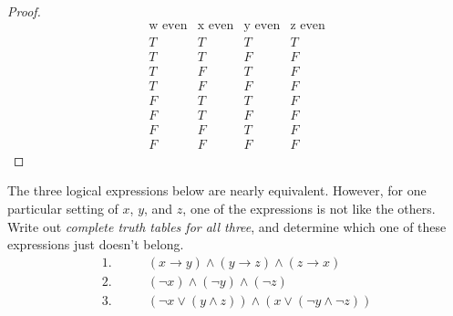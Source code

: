\documentclass[twoside,12pt]{article}
\begin{document}
{\begin{proof}
\[
\begin{array}{ccc|c}
\text{w even} & \text{x even} & \text{y even} & \text{z even} \\ \hline
T & T & T & T \\
T & T & F & F \\
T & F & T & F \\
T & F & F & F \\
F & T & T & F \\
F & T & F & F \\
F & F & T & F \\
F & F & F & F
\end{array}
\]

\end{proof}
}

\begin{problem}{14}
The three logical expressions below are nearly equivalent.  However,
for one particular setting of $x$, $y$, and $z$, one of the
expressions is not like the others.  Write out \textit{complete truth
tables for all three}, and determine which one of these expressions
just doesn't belong.
%
\begin{align*}
1. & \qquad (x \rightarrow y) \wedge (y \rightarrow z) \wedge (z \rightarrow x) \\
2. & \qquad (\neg x) \wedge (\neg y) \wedge (\neg z) \\
3. & \qquad (\neg x \vee (y \wedge z)) \wedge (x \vee (\neg y \wedge \neg z))
\end{align*}


\end{problem}


\end{document}
